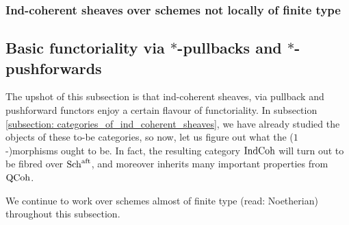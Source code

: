             \subsubsection{Ind-coherent sheaves over schemes not locally of finite type}
            
        \subsection{Basic functoriality via \texorpdfstring{$*$}{}-pullbacks and \texorpdfstring{$*$}{}-pushforwards}
            The upshot of this subsection is that ind-coherent sheaves, via pullback and pushforward functors enjoy a certain flavour of functoriality. In subsection \ref{subsection: categories_of_ind_coherent_sheaves}, we have already studied the objects of these to-be categories, so now, let us figure out what the ($1$-)morphisms ought to be. In fact, the resulting category $\mathrm{Ind}\mathrm{Coh}$ will turn out to be fibred over $\mathrm{Sch}^{\mathrm{aft}}$, and moreover inherits many important properties from $\mathrm{QCoh}$.
        
            \begin{convention}
                We continue to work over schemes almost of finite type (read: Noetherian) throughout this subsection.
            \end{convention}
            

